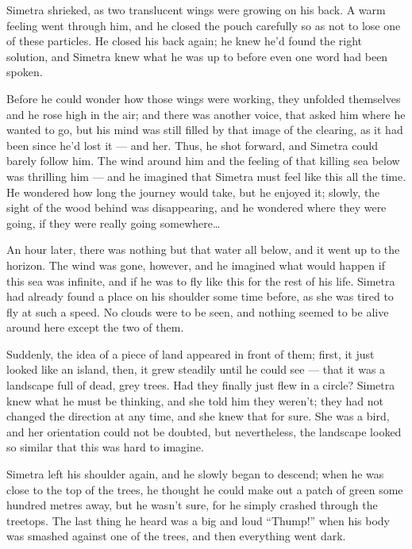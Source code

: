 Simetra shrieked, as two translucent wings were growing on his back. 
A warm feeling went through him, and he closed the pouch carefully so as not to lose one of these particles. He closed his back again; he knew he'd found the right solution, and Simetra knew what he was up to before even one word had been spoken. 

Before he could wonder how those wings were working, they unfolded themselves and he rose high in the air; and there was another voice, that asked him where he wanted to go, but his mind was still filled by that image of the clearing, as it had been since he'd lost it --- and her.
Thus, he shot forward, and Simetra could barely follow him. The wind around him and the feeling of that killing sea below was thrilling him --- and he imagined that Simetra must feel like this all the time. He wondered how long the journey would take, but he enjoyed it; slowly, the sight of the wood behind was disappearing, and he wondered where they were going, if they were really going somewhere\dots

An hour later, there was nothing but that water all below, and it went up to the horizon. The wind was gone, however, and he imagined what would happen if this sea was infinite, and if he was to fly like this for the rest of his life. Simetra had already found a place on his shoulder some time before, as she was tired to fly at such a speed. No clouds were to be seen, and nothing seemed to be alive around here except the two of them.

Suddenly, the idea of a piece of land appeared in front of them; first, it just looked like an island, then, it grew steadily until he could see --- that it was a landscape full of dead, grey trees. Had they finally just flew in a circle? Simetra knew what he must be thinking, and she told him they weren't; they had not changed the direction at any time, and she knew that for sure. She was a bird, and her orientation could not be doubted, but nevertheless, the landscape looked so similar that this was hard to imagine.

Simetra left his shoulder again, and he slowly began to descend; when he was close to the top of the trees, he thought he could make out a patch of green some hundred metres away, but he wasn't sure, for he simply crashed through the treetops. The last thing he heard was a big and loud \enquote{Thump!} when his body was smashed against one of the trees, and then everything went dark. 
